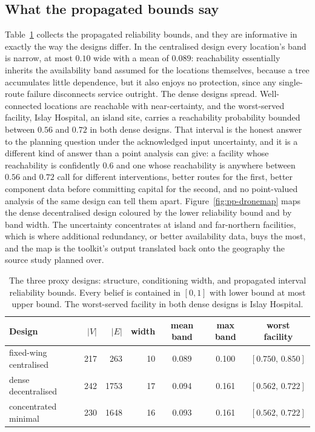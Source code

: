 \documentclass[12pt]{report}
\begin{document}
\subsection{What the propagated bounds say}
\label{sec:pp-case-results}

Table~\ref{tab:pp-drone} collects the propagated reliability bounds, and they are informative in exactly the way the designs differ. In the centralised design every location's band is narrow, at most $0.10$ wide with a mean of $0.089$: reachability essentially inherits the availability band assumed for the locations themselves, because a tree accumulates little dependence, but it also enjoys no protection, since any single-route failure disconnects service outright. The dense designs spread. Well-connected locations are reachable with near-certainty, and the worst-served facility, Islay Hospital, an island site, carries a reachability probability bounded between $0.56$ and $0.72$ in both dense designs. That interval is the honest answer to the planning question under the acknowledged input uncertainty, and it is a different kind of answer than a point analysis can give: a facility whose reachability is confidently $0.6$ and one whose reachability is anywhere between $0.56$ and $0.72$ call for different interventions, better routes for the first, better component data before committing capital for the second, and no point-valued analysis of the same design can tell them apart. Figure~\ref{fig:pp-dronemap} maps the dense decentralised design coloured by the lower reliability bound and by band width. The uncertainty concentrates at island and far-northern facilities, which is where additional redundancy, or better availability data, buys the most, and the map is the toolkit's output translated back onto the geography the source study planned over.

\begin{table}[htbp]
\centering
\caption{The three proxy designs: structure, conditioning width, and propagated interval reliability bounds. Every belief is contained in $[0,1]$ with lower bound at most upper bound. The worst-served facility in both dense designs is Islay Hospital.}
\label{tab:pp-drone}
\small
\renewcommand{\arraystretch}{1.2}
\begin{tabular}{lrrrccc}
\toprule
Design & $|V|$ & $|E|$ & width & mean band & max band & worst facility \\
\midrule
fixed-wing centralised & 217 & 263 & 10 & 0.089 & 0.100 & $[0.750,\, 0.850]$ \\
dense decentralised & 242 & 1753 & 17 & 0.094 & 0.161 & $[0.562,\, 0.722]$ \\
concentrated minimal & 230 & 1648 & 16 & 0.093 & 0.161 & $[0.562,\, 0.722]$ \\
\bottomrule
\end{tabular}
\end{table}
\end{document}
